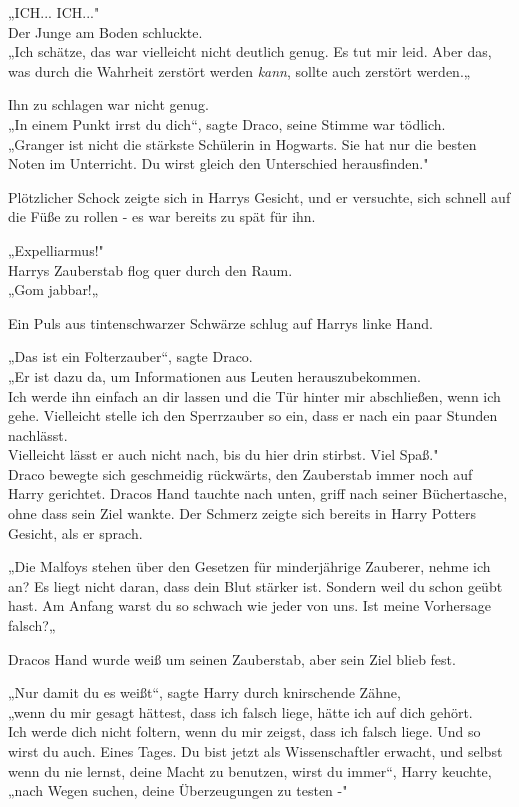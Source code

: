 {„ICH... ICH..."\\ Der Junge am Boden schluckte.\\ „Ich schätze, das war vielleicht nicht deutlich genug. Es tut mir leid. Aber das, was durch die Wahrheit zerstört werden \emph{kann}, sollte auch zerstört werden.„

Ihn zu schlagen war nicht genug.\\ „In einem Punkt irrst du dich“, sagte Draco, seine Stimme war tödlich.\\ „Granger ist nicht die stärkste Schülerin in Hogwarts. Sie hat nur die besten Noten im Unterricht. Du wirst gleich den Unterschied herausfinden."

Plötzlicher Schock zeigte sich in Harrys Gesicht, und er versuchte, sich schnell auf die Füße zu rollen - es war bereits zu spät für ihn.

„Expelliarmus!"\\ Harrys Zauberstab flog quer durch den Raum.\\ „Gom jabbar!„

Ein Puls aus tintenschwarzer Schwärze schlug auf Harrys linke Hand.

„Das ist ein Folterzauber“, sagte Draco.\\ „Er ist dazu da, um Informationen aus Leuten herauszubekommen.\\ Ich werde ihn einfach an dir lassen und die Tür hinter mir abschließen, wenn ich gehe. Vielleicht stelle ich den Sperrzauber so ein, dass er nach ein paar Stunden nachlässt.\\ Vielleicht lässt er auch nicht nach, bis du hier drin stirbst. Viel Spaß."\\ Draco bewegte sich geschmeidig rückwärts, den Zauberstab immer noch auf Harry gerichtet. Dracos Hand tauchte nach unten, griff nach seiner Büchertasche, ohne dass sein Ziel wankte. Der Schmerz zeigte sich bereits in Harry Potters Gesicht, als er sprach.

„Die Malfoys stehen über den Gesetzen für minderjährige Zauberer, nehme ich an? Es liegt nicht daran, dass dein Blut stärker ist. Sondern weil du schon geübt hast. Am Anfang warst du so schwach wie jeder von uns. Ist meine Vorhersage falsch?„

Dracos Hand wurde weiß um seinen Zauberstab, aber sein Ziel blieb fest.

„Nur damit du es weißt“, sagte Harry durch knirschende Zähne,\\ „wenn du mir gesagt hättest, dass ich falsch liege, hätte ich auf dich gehört.\\ Ich werde dich nicht foltern, wenn du mir zeigst, dass ich falsch liege. Und so wirst du auch. Eines Tages. Du bist jetzt als Wissenschaftler erwacht, und selbst wenn du nie lernst, deine Macht zu benutzen, wirst du immer“, Harry keuchte,\\ „nach Wegen suchen, deine Überzeugungen zu testen -"

}
